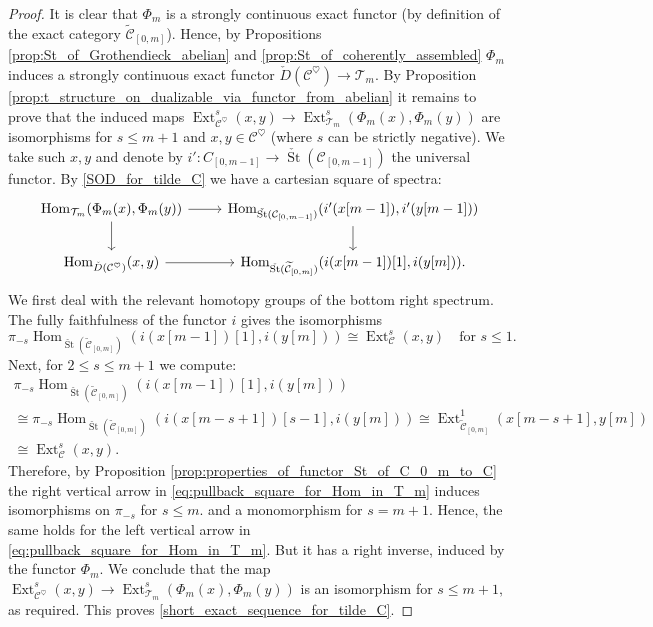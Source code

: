 \documentclass[11pt,leqno]{amsart}
\numberwithin{equation}{section}
\def\wt{\widetilde}
\def\Hom{\operatorname{Hom}}
\newcommand{\St}{\operatorname{St}}
\newcommand{\cC}{{\mathcal C}}
\newcommand{\cT}{{\mathcal T}}
\newcommand{\Ext}{\operatorname{Ext}}
\begin{document}
\begin{proof}
It is clear that $\Phi_m$ is a strongly continuous exact functor (by definition of the exact category $\wt{\cC}_{[0,m]}$). Hence, by Propositions \ref{prop:St_of_Grothendieck_abelian} and \ref{prop:St_of_coherently_assembled} $\Phi_m$ induces a strongly continuous exact functor $\check{D}(\cC^{\heartsuit})\to \cT_m.$ By Proposition \ref{prop:t_structure_on_dualizable_via_functor_from_abelian} it remains to prove that the induced maps $\Ext^s_{\cC^{\heartsuit}}(x,y)\to \Ext^s_{\cT_m}(\Phi_m(x),\Phi_m(y))$ are isomorphisms for $s\leq m+1$ and $x,y\in\cC^{\heartsuit}$ (where $s$ can be strictly negative). We take such $x,y$ and denote by $i':C_{[0,m-1]}\to \check{\St}(\cC_{[0,m-1]})$ the universal functor. By \ref{SOD_for_tilde_C} we have a cartesian square of spectra:
\begin{equation}\label{eq:pullback_square_for_Hom_in_T_m}
\begin{tikzcd}
\Hom_{\cT_m}(\Phi_m(x),\Phi_m(y)) \ar[r]\ar[d] & \Hom_{\check{\St}(\cC_{[0,m-1]})}(i'(x[m-1]),i'(y[m-1]))\ar[d]\\
\Hom_{\check{D}(\cC^{\heartsuit})}(x,y)\ar[r] & \Hom_{\check{\St}(\wt{\cC}_{[0,m]})}(i(x[m-1])[1],i(y[m])).
\end{tikzcd}
\end{equation}
We first deal with the relevant homotopy groups of the bottom right spectrum. The fully faithfulness of the functor $i$ gives the isomorphisms
\begin{equation*}
\pi_{-s}\Hom_{\check{\St}(\wt{\cC}_{[0,m]})}(i(x[m-1])[1],i(y[m]))\cong \Ext^s_{\cC}(x,y)\quad\text{for }s\leq 1.
\end{equation*}
Next, for $2\leq s\leq m+1$ we compute:
\begin{multline*}
\pi_{-s}\Hom_{\check{\St}(\wt{\cC}_{[0,m]})}(i(x[m-1])[1],i(y[m]))\\
\cong \pi_{-s}\Hom_{\check{\St}(\wt{\cC}_{[0,m]})}(i(x[m-s+1])[s-1],i(y[m]))\cong \Ext^1_{\wt{\cC}_{[0,m]}}(x[m-s+1],y[m])\\
\cong \Ext^s_{\cC}(x,y).
\end{multline*}
Therefore, by Proposition \ref{prop:properties_of_functor_St_of_C_0_m_to_C} the right vertical arrow in \eqref{eq:pullback_square_for_Hom_in_T_m} induces isomorphisms on $\pi_{-s}$ for $s\leq m.$ and a monomorphism for $s=m+1.$ Hence, the same holds for the left vertical arrow in \eqref{eq:pullback_square_for_Hom_in_T_m}. But it has a right inverse, induced by the functor $\Phi_m.$ We conclude that the map $\Ext^s_{\cC^{\heartsuit}}(x,y)\to\Ext^s_{\cT_m}(\Phi_m(x),\Phi_m(y))$ is an isomorphism for $s\leq m+1,$ as required. This proves \ref{short_exact_sequence_for_tilde_C}. 
\end{proof}
\end{document}
